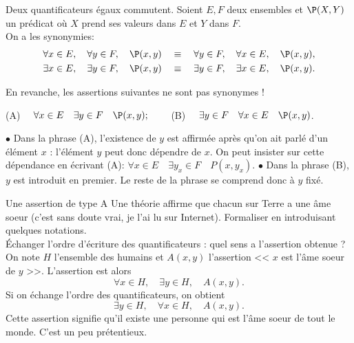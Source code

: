 \documentclass[11pt]{article}
\begin{document}
\begin{prop}{Deux quantificateurs égaux commutent.}{}
    Soient $E,F$ deux ensembles et $\P(X,Y)$ un prédicat où $X$ prend ses valeurs dans $E$ et $Y$ dans $F$.\\
    On a les synonymies:
    \begin{equation*}
        \begin{aligned}
            \forall x \in E, \quad \forall y \in F, \quad \P(x,y) \quad &\equiv \quad \forall y \in F, \quad \forall x \in E, \quad \P(x,y),\\
            \exists x \in E, \quad \exists y \in F, \quad \P(x,y) \quad &\equiv \quad \exists y \in F, \quad \exists x \in E, \quad \P(x,y).
        \end{aligned}
    \end{equation*}
\end{prop}

\warning En revanche, les assertions suivantes ne sont pas synonymes !
\begin{center}
    (A) $\quad \forall x \in E\quad\exists y \in F\quad \P(x,y); \qquad$ (B) $\quad \exists y\in F \quad \forall x \in E\quad \P(x,y)$.
\end{center}
$\bullet$ Dans la phrase (A), l'existence de $y$ est affirmée après qu'on ait parlé d'un élément $x$ : l'élément $y$ peut donc dépendre de $x$. On peut insister sur cette dépendance en écrivant (A): $\forall x\in E\quad\exists y_x\in F\quad P(x,y_x)$.\n
$\bullet$ Dans la phrase (B), $y$ est introduit en premier. Le reste de la phrase se comprend donc à $y$ fixé.



\begin{ex}{Une assertion de type A}{}
    Une théorie affirme que chacun sur Terre a une âme soeur (c'est sans doute vrai, je l'ai lu sur Internet). Formaliser en introduisant quelques notations.\\
    Échanger l'ordre d'écriture des quantificateurs : quel sens a l'assertion obtenue ?
    \tcblower
    On note $H$ l'ensemble des humains et $A(x,y)$ l'assertion << $x$ est l'âme soeur de $y$ >>. L'assertion est alors
    \begin{equation*}
        \forall x \in H, \quad \exists y \in H, \quad A(x,y).
    \end{equation*}
    Si on échange l'ordre des quantificateurs, on obtient
    \begin{equation*}
        \exists y \in H, \quad \forall x \in H, \quad A(x,y).
    \end{equation*}
    Cette assertion signifie qu'il existe une personne qui est l'âme soeur de tout le monde. C'est un peu prétentieux.
\end{ex}
\end{document}
